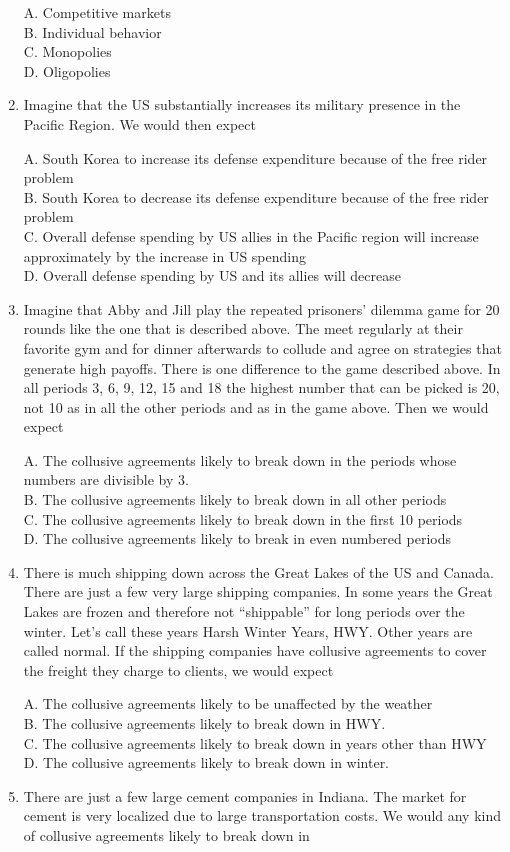 \documentclass[
]{book}
\begin{document}
\begin{enumerate}
  A. Competitive markets\\
  B. Individual behavior\\
  C. Monopolies\\
  D. Oligopolies
\item
  Imagine that the US substantially increases its military presence in the Pacific Region. We would then expect

  A. South Korea to increase its defense expenditure because of the free rider problem\\
  B. South Korea to decrease its defense expenditure because of the free rider problem\\
  C. Overall defense spending by US allies in the Pacific region will increase approximately by the increase in US spending\\
  D. Overall defense spending by US and its allies will decrease
\item
  Imagine that Abby and Jill play the repeated prisoners' dilemma game for 20 rounds like the one that is described above. The meet regularly at their favorite gym and for dinner afterwards to collude and agree on strategies that generate high payoffs. There is one difference to the game described above. In all periods 3, 6, 9, 12, 15 and 18 the highest number that can be picked is 20, not 10 as in all the other periods and as in the game above. Then we would expect

  A. The collusive agreements likely to break down in the periods whose numbers are divisible by 3.\\
  B. The collusive agreements likely to break down in all other periods\\
  C. The collusive agreements likely to break down in the first 10 periods\\
  D. The collusive agreements likely to break in even numbered periods
\item
  There is much shipping down across the Great Lakes of the US and Canada. There are just a few very large shipping companies. In some years the Great Lakes are frozen and therefore not ``shippable'' for long periods over the winter. Let's call these years Harsh Winter Years, HWY. Other years are called normal. If the shipping companies have collusive agreements to cover the freight they charge to clients, we would expect

  A. The collusive agreements likely to be unaffected by the weather\\
  B. The collusive agreements likely to break down in HWY.\\
  C. The collusive agreements likely to break down in years other than HWY\\
  D. The collusive agreements likely to break down in winter.
\item
  There are just a few large cement companies in Indiana. The market for cement is very localized due to large transportation costs. We would any kind of collusive agreements likely to break down in


\end{enumerate}
\end{document}
